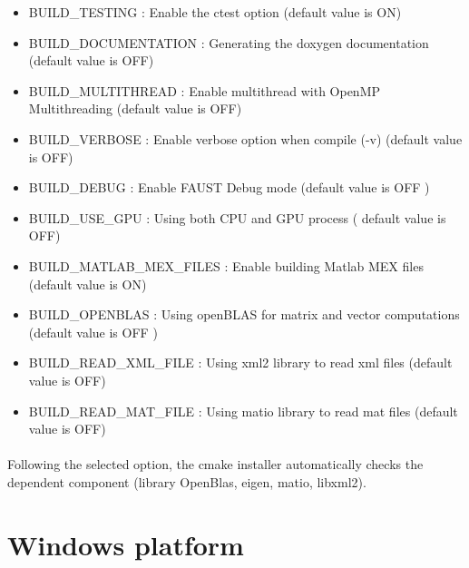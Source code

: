 \begin{itemize}
\item BUILD\_TESTING : Enable the ctest option (default value is ON)
\item BUILD\_DOCUMENTATION : Generating the doxygen documentation (default value is OFF)  
\item BUILD\_MULTITHREAD : Enable multithread with OpenMP Multithreading (default value is OFF)
\item BUILD\_VERBOSE : Enable verbose option when compile (-v) (default value is OFF)
\item BUILD\_DEBUG : Enable FAUST Debug mode (default value is OFF )
\item BUILD\_USE\_GPU : Using both CPU and GPU process ( default value is OFF)
\item BUILD\_MATLAB\_MEX\_FILES : Enable building Matlab MEX files (default value is ON)
\item BUILD\_OPENBLAS : Using openBLAS for matrix and vector computations (default value is OFF )
\item BUILD\_READ\_XML\_FILE : Using xml2 library to read xml files (default value is OFF)
\item BUILD\_READ\_MAT\_FILE : Using matio library to read mat files (default value is OFF)
\end{itemize}

\paragraph{}Following the selected option, the cmake installer automatically checks the dependent component (library OpenBlas, eigen, matio, libxml2).  






\section{Windows platform}\label{sec:WinInstall}

